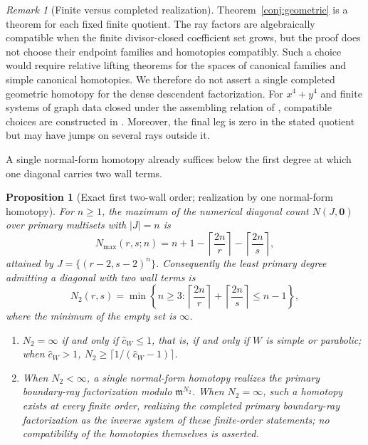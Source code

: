 \documentclass[11pt]{amsart}
\newtheorem{proposition}[theorem]{Proposition}
\theoremstyle{definition}
\theoremstyle{remark}
\newtheorem{remark}[theorem]{Remark}
\newcommand{\chat}{\hat{c}}
\begin{document}
\begin{remark}[Finite versus completed realization]
Theorem~\ref{conj:geometric} is a theorem for each fixed finite quotient.  The
ray factors are algebraically compatible when the finite divisor-closed
coefficient set grows,
but the proof does not choose their endpoint families and homotopies
compatibly.  Such a choice would require relative lifting theorems for the
spaces of canonical families and simple canonical homotopies.  We therefore
do not assert a single completed geometric homotopy for the dense descendent
factorization.  For $x^4+y^4$ and finite systems of graph data closed under
the assembling relation of \cite{GKT}, compatible choices are constructed in
\cite[Theorem~5.7 and Appendix~B]{annular}.  Moreover, the final leg is zero
in the stated quotient but may have jumps on several rays outside it.
\end{remark}

A single normal-form homotopy already suffices below the first degree at which
one diagonal carries two wall terms.

\begin{proposition}[Exact first two-wall order; realization by one
normal-form homotopy]
\label{prop:parabolicgeom}
For $n\ge1$, the maximum of the numerical diagonal count
$N(J,\mathbf0)$ over primary multisets with $\lvert J\rvert=n$ is
\[
N_{\max}(r,s;n)
=n+1-\left\lceil\frac{2n}{r}\right\rceil
-\left\lceil\frac{2n}{s}\right\rceil ,
\]
attained by $J=\{(r-2,s-2)^n\}$. Consequently the least primary degree
admitting a diagonal with two wall terms is
\[
N_2(r,s)=
\min\left\{n\ge3:
\left\lceil\frac{2n}{r}\right\rceil+
\left\lceil\frac{2n}{s}\right\rceil\le n-1\right\},
\]
where the minimum of the empty set is $\infty$.
\begin{enumerate}
\item[(i)] $N_{2}=\infty$ if and only if $\chat_{W}\le1$, that is, if and only if
$W$ is simple or parabolic; when $\chat_W>1$,
$N_{2}\ge\lceil 1/(\chat_{W}-1)\rceil$.
\item[(ii)] When $N_2<\infty$, a single normal-form
homotopy realizes the primary boundary-ray factorization modulo $\mathfrak m^{N_{2}}$. When
$N_2=\infty$, such a homotopy exists at every finite order, realizing the
completed primary boundary-ray factorization as the inverse system of these finite-order
statements; no compatibility of the homotopies themselves is asserted.
\end{enumerate}
\end{proposition}
\end{document}
